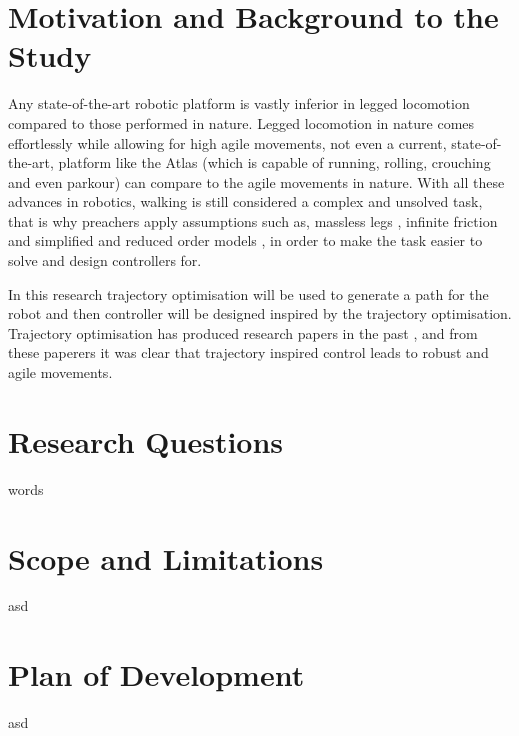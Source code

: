 \section{Motivation and Background to the Study}
Any state-of-the-art robotic platform is vastly inferior in legged locomotion compared to those performed in nature. Legged locomotion in nature comes effortlessly while allowing for high agile movements, not even a current, state-of-the-art, platform like the Atlas \cite{Atlas-2019} (which is capable of running, rolling, crouching and even parkour) can compare to the agile movements in nature. With all these advances in robotics, walking is still considered a complex and unsolved task, that is why preachers apply assumptions such as, massless legs \cite{Kamimura-2018}\cite{Gan-2018}, infinite friction \cite{Kamimura-2018}\cite{Xi-2016} and simplified and reduced order models \cite{Reher-2019}, in order to make the task easier to solve and design controllers for.

In this research trajectory optimisation will be used to generate a path for the robot and then controller will be designed inspired by the trajectory optimisation. Trajectory optimisation has produced research papers in the past \cite{Baleka-2020}\cite{Beck-2009}, and from these paperers it was clear that trajectory inspired control leads to robust and agile movements. 

\section{Research Questions}
words

\section{Scope and Limitations}
asd

\section{Plan of Development}
asd


